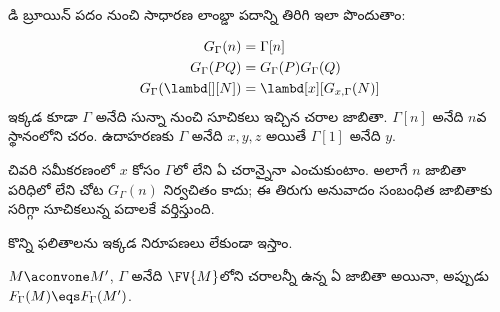 \documentclass[../../../include/open-logic-section]{subfiles}
\begin{document}
డి బ్రూయిన్ పదం నుంచి సాధారణ లాంబ్డా పదాన్ని తిరిగి ఇలా పొందుతాం:

\begin{defn}
  \begin{align*}
    G_\Gamma(n) &= \Gamma[n] \\
    G_\Gamma(PQ) &= G_\Gamma(P) G_\Gamma(Q) \\
    G_\Gamma(\lambd[][N]) &= \lambd[x][G_{x,\Gamma}(N)]
  \end{align*}
  ఇక్కడ కూడా $\Gamma$ అనేది సున్నా నుంచి సూచికలు ఇచ్చిన చరాల జాబితా.
  $\Gamma[n]$ అనేది $n$వ స్థానంలోని చరం. ఉదాహరణకు
  $\Gamma$ అనేది $x,y,z$ అయితే $\Gamma[1]$ అనేది $y$.

  చివరి సమీకరణంలో $x$ కోసం $\Gamma$లో లేని ఏ చరాన్నైనా
  ఎంచుకుంటాం. అలాగే $n$ జాబితా పరిధిలో లేని చోట
  $G_\Gamma(n)$ నిర్వచితం కాదు; ఈ తిరుగు అనువాదం
  సంబంధిత జాబితాకు సరిగ్గా సూచికలున్న పదాలకే వర్తిస్తుంది.
\end{defn}

కొన్ని ఫలితాలను ఇక్కడ నిరూపణలు లేకుండా ఇస్తాం.

\begin{prop}
  $M \aconvone M'$, $\Gamma$ అనేది $\FV{M}$లోని
  చరాలన్నీ ఉన్న ఏ జాబితా అయినా, అప్పుడు
  $F_\Gamma(M) \eqs F_\Gamma(M')$.
\end{prop}
\end{document}
